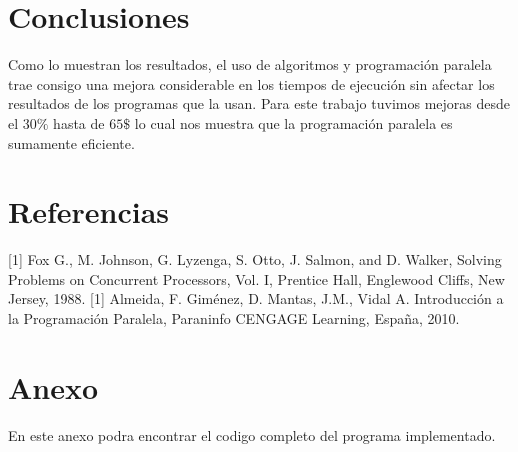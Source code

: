 \documentclass[10pt]{IEEEtran}
\begin{document}
\section{Conclusiones}
Como lo muestran los resultados, el uso de algoritmos y programación paralela trae consigo una mejora considerable en los tiempos de ejecución sin afectar los resultados de los programas que la usan. Para este trabajo tuvimos mejoras desde el $30\%$ hasta de $65\$$ lo cual nos muestra que la programación paralela es sumamente eficiente.

\section{Referencias}
{[1]} Fox G., M. Johnson, G. Lyzenga, S. Otto, J. Salmon, and D. Walker, Solving Problems on Concurrent Processors, Vol. I, Prentice Hall, Englewood Cliffs, New Jersey, 1988.
{[1]} Almeida, F. Giménez, D. Mantas, J.M., Vidal A. Introducción a la Programación Paralela, Paraninfo CENGAGE Learning, España, 2010.

\clearpage

\section{Anexo}
En este anexo podra encontrar el codigo completo del programa implementado.
\end{document}
